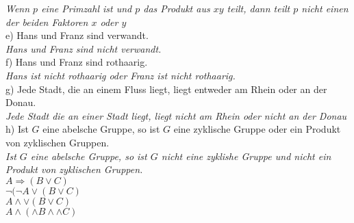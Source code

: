 \textit{Wenn $p$ eine Primzahl ist und $p$ das Produkt aus $xy$ teilt, dann teilt $p$ nicht einen der beiden Faktoren $x$ oder $y$}\\

e) Hans und Franz sind verwandt.\\

\textit{Hans und Franz sind nicht verwandt.}\\

f) Hans und Franz sind rothaarig.\\

\textit{Hans ist nicht rothaarig oder Franz ist nicht rothaarig.}\\

g) Jede Stadt, die an einem Fluss liegt, liegt entweder am Rhein oder an der Donau.\\

\textit{Jede Stadt die an einer Stadt liegt, liegt nicht am Rhein oder nicht an der Donau}\\

h) Ist $G$ eine abelsche Gruppe, so ist $G$ eine zyklische Gruppe oder ein Produkt von zyklischen Gruppen.\\

\textit{Ist $G$ eine abelsche Gruppe, so ist $G$ nicht eine zyklishe Gruppe und nicht ein Produkt von zyklischen Gruppen.}\\

$A \Rightarrow (B \lor C)$\\
$\lnot (\lnot A \lor (B \lor C)$\\
$A \land \lor (B \lor C)$\\
$A \land (\land B \land \land C)$

